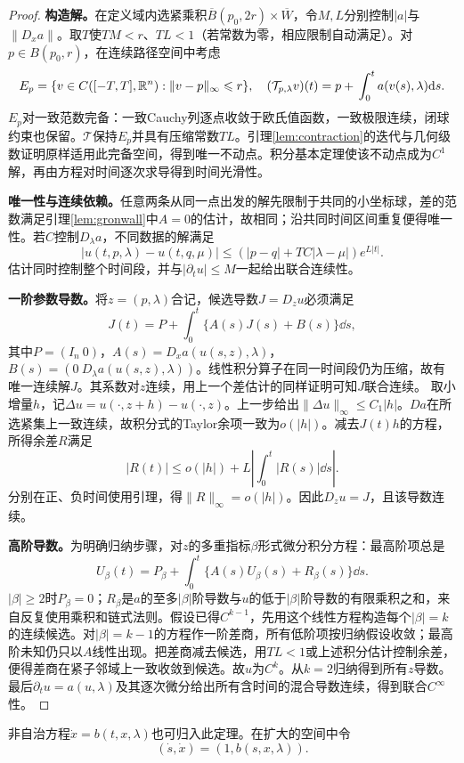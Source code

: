 \begin{proof}
\textbf{构造解。}在定义域内选紧乘积$\overline B(p_0,2r)\times\overline W$，令$M,L$分别控制$|a|$与$\|D_xa\|$。取$T$使$TM<r$、$TL<1$（若常数为零，相应限制自动满足）。对$p\in B(p_0,r)$，在连续路径空间中考虑
\[
 E_p=\{v\in C([-T,T],\R^n):\|v-p\|_\infty\leq r\},\quad
 (\mathcal T_{p,\lambda}v)(t)=p+\int_0^t a(v(s),\lambda)\dd s.
\]
$E_p$对一致范数完备：一致Cauchy列逐点收敛于欧氏值函数，一致极限连续，闭球约束也保留。$\mathcal T$保持$E_p$并具有压缩常数$TL$。引理\ref{lem:contraction}的迭代与几何级数证明原样适用此完备空间，得到唯一不动点。积分基本定理使该不动点成为$C^1$解，再由方程对时间逐次求导得到时间光滑性。

\textbf{唯一性与连续依赖。}任意两条从同一点出发的解先限制于共同的小坐标球，差的范数满足引理\ref{lem:gronwall}中$A=0$的估计，故相同；沿共同时间区间重复便得唯一性。若$C$控制$D_\lambda a$，不同数据的解满足
\[
 |u(t,p,\lambda)-u(t,q,\mu)|
 \leq (|p-q|+TC|\lambda-\mu|)e^{L|t|}.
\]
估计同时控制整个时间段，并与$|\partial_tu|\leq M$一起给出联合连续性。

\textbf{一阶参数导数。}将$z=(p,\lambda)$合记，候选导数$J=D_z u$必须满足
\[
 J(t)=P+\int_0^t\{A(s)J(s)+B(s)\}\dd s,
\]
其中$P=(I_n\ 0)$，$A(s)=D_xa(u(s,z),\lambda)$，$B(s)=(0\ D_\lambda a(u(s,z),\lambda))$。线性积分算子在同一时间段仍为压缩，故有唯一连续解$J$。其系数对$z$连续，用上一个差估计的同样证明可知$J$联合连续。
取小增量$h$，记$\Delta u=u(\cdot,z+h)-u(\cdot,z)$。上一步给出$\|\Delta u\|_\infty\leq C_1|h|$。$Da$在所选紧集上一致连续，故积分式的Taylor余项一致为$o(|h|)$。减去$J(t)h$的方程，所得余差$R$满足
\[
 |R(t)|\leq o(|h|)+L\left|\int_0^t |R(s)|\dd s\right|.
\]
分别在正、负时间使用引理，得$\|R\|_\infty=o(|h|)$。因此$D_z u=J$，且该导数连续。

\textbf{高阶导数。}为明确归纳步骤，对$z$的多重指标$\beta$形式微分积分方程：最高阶项总是
\[
 U_\beta(t)=P_\beta+\int_0^t
 \{A(s)U_\beta(s)+R_\beta(s)\}\dd s.
\]
$|\beta|\geq2$时$P_\beta=0$；$R_\beta$是$a$的至多$|\beta|$阶导数与$u$的低于$|\beta|$阶导数的有限乘积之和，来自反复使用乘积和链式法则。假设已得$C^{k-1}$，先用这个线性方程构造每个$|\beta|=k$的连续候选。对$|\beta|=k-1$的方程作一阶差商，所有低阶项按归纳假设收敛；最高阶未知仍只以$A$线性出现。把差商减去候选，用$TL<1$或上述积分估计控制余差，便得差商在紧子邻域上一致收敛到候选。故$u$为$C^k$。从$k=2$归纳得到所有$z$导数。最后$\partial_tu=a(u,\lambda)$及其逐次微分给出所有含时间的混合导数连续，得到联合$C^\infty$性。
\end{proof}
非自治方程$\dot x=b(t,x,\lambda)$也可归入此定理。在扩大的空间中令
\[
 (\dot s,\dot x)=(1,b(s,x,\lambda)).
\]

